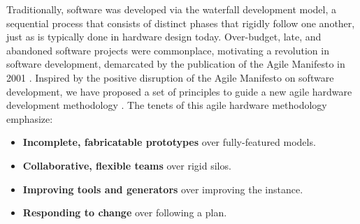 Traditionally, software was developed via the waterfall development
model, a sequential process that consists of distinct phases that
rigidly follow one another, just as is typically done in hardware design today.
Over-budget, late, and abandoned software projects were commonplace,
motivating a revolution in software development, demarcated by the
publication of the Agile Manifesto in 2001 \cite{agile}.
Inspired by the positive disruption of the Agile Manifesto on software
development, we have proposed a set of principles to guide a new agile
hardware development methodology \cite{lee-micro15}.
The tenets of this agile hardware methodology emphasize:
\begin{itemize}
\item {\bf Incomplete, fabricatable prototypes} over fully-featured models.
\item {\bf Collaborative, flexible teams} over rigid silos.
\item {\bf Improving tools and generators} over improving the instance.
\item {\bf Responding to change} over following a plan.
\end{itemize}

